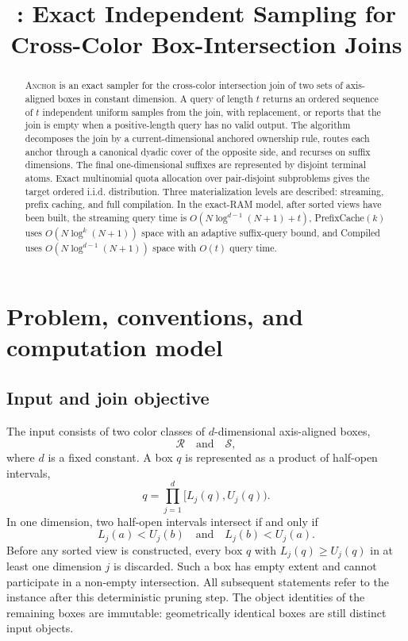 \documentclass[11pt]{article}
\title{\ANCHOR: Exact Independent Sampling for Cross-Color Box-Intersection Joins}
\author{}
\date{}
\DeclareRobustCommand{\ANCHOR}{\textnormal{\textsc{Anchor}}}
\theoremstyle{definition}
\begin{document}
\maketitle

\begin{abstract}
\ANCHOR{} is an exact sampler for the cross-color intersection join of two sets of axis-aligned boxes in constant dimension.  A query of length $t$ returns an ordered sequence of $t$ independent uniform samples from the join, with replacement, or reports that the join is empty when a positive-length query has no valid output.  The algorithm decomposes the join by a current-dimensional anchored ownership rule, routes each anchor through a canonical dyadic cover of the opposite side, and recurses on suffix dimensions.  The final one-dimensional suffixes are represented by disjoint terminal atoms.  Exact multinomial quota allocation over pair-disjoint subproblems gives the target ordered i.i.d. distribution.  Three materialization levels are described: streaming, prefix caching, and full compilation.  In the exact-RAM model, after sorted views have been built, the streaming query time is $O(N\log^{d-1}(N+1)+t)$, PrefixCache$(k)$ uses $O(N\log^k(N+1))$ space with an adaptive suffix-query bound, and Compiled uses $O(N\log^{d-1}(N+1))$ space with $O(t)$ query time.
\end{abstract}

\section{Problem, conventions, and computation model}
\label{sec:setup}

\subsection{Input and join objective}

The input consists of two color classes of $d$-dimensional axis-aligned boxes,
\[
  \mathcal R \quad\text{and}\quad \mathcal S,
\]
where $d$ is a fixed constant.  A box $q$ is represented as a product of half-open intervals,
\[
  q=\prod_{j=1}^d [L_j(q),U_j(q)).
\]
In one dimension, two half-open intervals intersect if and only if
\[
  L_j(a)<U_j(b)
  \quad\text{and}\quad
  L_j(b)<U_j(a).
\]
Before any sorted view is constructed, every box $q$ with $L_j(q)\ge U_j(q)$ in at least one dimension $j$ is discarded.  Such a box has empty extent and cannot participate in a non-empty intersection.  All subsequent statements refer to the instance after this deterministic pruning step.  The object identities of the remaining boxes are immutable: geometrically identical boxes are still distinct input objects.
\end{document}
